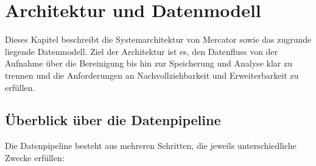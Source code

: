 \section{Architektur und Datenmodell}
\label{sec:architektur}

Dieses Kapitel beschreibt die Systemarchitektur von Mercator sowie das zugrunde liegende Datenmodell. Ziel der Architektur ist es, den Datenfluss von der Aufnahme über die Bereinigung bis hin zur Speicherung und Analyse klar zu trennen und die Anforderungen an Nachvollziehbarkeit und Erweiterbarkeit zu erfüllen.

\subsection{Überblick über die Datenpipeline}

Die Datenpipeline besteht aus mehreren Schritten, die jeweils unterschiedliche Zwecke erfüllen:

